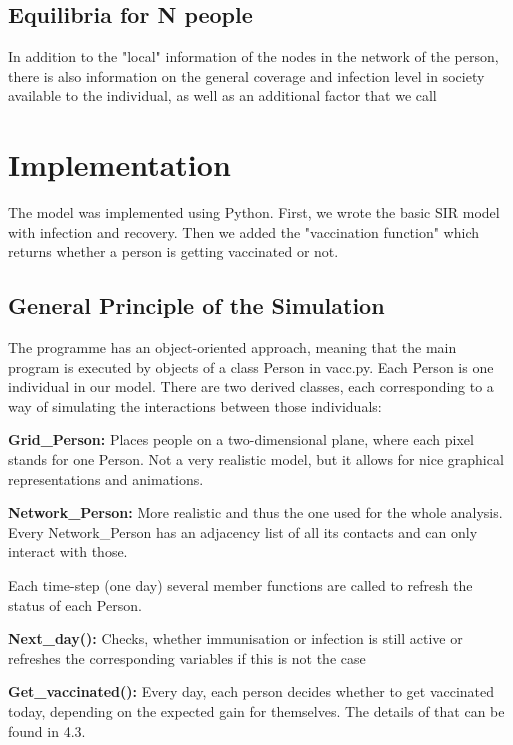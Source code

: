 \documentclass[11pt]{article}
\begin{document}
\subsection{Equilibria for N people}
In addition to the "local" information of the nodes in the network of the person, there is also information on the general coverage and infection level in society available to the individual, as well as an additional factor that we call 


\section{Implementation}
The model was implemented using Python. First, we wrote the basic SIR model with infection and recovery. Then we added the "vaccination function" which returns whether a person is getting vaccinated or not. 

\vspace{14px}

\subsection{General Principle of the Simulation}
The programme has an object-oriented approach, meaning that the main program is executed by objects of a class Person in vacc.py. Each Person is one individual in our model. There are two derived classes, each corresponding to a way of simulating the interactions between those individuals:
\vspace{14px}

\textbf{Grid\_Person:} Places people on a two-dimensional plane, where each pixel stands for one Person. Not a very realistic model, but it allows for nice graphical representations and animations.
\vspace{14px}

\textbf{Network\_Person:} More realistic and thus the one used for the whole analysis. Every Network\_Person has an adjacency list of all its contacts and can only interact with those.
\vspace{14px}

Each time-step (one day) several member functions are called to refresh the status of each Person.

\textbf{Next\_day():} Checks, whether immunisation or infection is still active or refreshes the corresponding variables if this is not the case

\textbf{Get\_vaccinated():} Every day, each person decides whether to get vaccinated today, depending on the expected gain for themselves. The details of that can be found in 4.3. 
\end{document}
